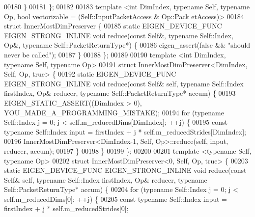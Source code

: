 \begin{DoxyCode}
00180   \}
00181 \};
00182 
00183 \textcolor{keyword}{template} <\textcolor{keywordtype}{int} DimIndex, \textcolor{keyword}{typename} Self, \textcolor{keyword}{typename} Op, \textcolor{keywordtype}{bool} vectorizable = (Self::InputPacketAccess & Op::Pack
      etAccess)>
00184 \textcolor{keyword}{struct }InnerMostDimPreserver \{
00185   \textcolor{keyword}{static} EIGEN\_DEVICE\_FUNC EIGEN\_STRONG\_INLINE \textcolor{keywordtype}{void} reduce(\textcolor{keyword}{const} Self&, \textcolor{keyword}{typename} Self::Index, Op&, \textcolor{keyword}{typename}
       Self::PacketReturnType*) \{
00186     eigen\_assert(\textcolor{keyword}{false} && \textcolor{stringliteral}{"should never be called"});
00187   \}
00188 \};
00189 
00190 \textcolor{keyword}{template} <\textcolor{keywordtype}{int} DimIndex, \textcolor{keyword}{typename} Self, \textcolor{keyword}{typename} Op>
00191 \textcolor{keyword}{struct }InnerMostDimPreserver<DimIndex, Self, Op, true> \{
00192   \textcolor{keyword}{static} EIGEN\_DEVICE\_FUNC EIGEN\_STRONG\_INLINE \textcolor{keywordtype}{void} reduce(\textcolor{keyword}{const} Self& \textcolor{keyword}{self}, \textcolor{keyword}{typename} Self::Index 
      firstIndex, Op& reducer, \textcolor{keyword}{typename} Self::PacketReturnType* accum) \{
00193     EIGEN\_STATIC\_ASSERT((DimIndex > 0), YOU\_MADE\_A\_PROGRAMMING\_MISTAKE);
00194     \textcolor{keywordflow}{for} (\textcolor{keyword}{typename} Self::Index j = 0; j < \textcolor{keyword}{self}.m\_reducedDims[DimIndex]; ++j) \{
00195       \textcolor{keyword}{const} \textcolor{keyword}{typename} Self::Index input = firstIndex + j * \textcolor{keyword}{self}.m\_reducedStrides[DimIndex];
00196       InnerMostDimPreserver<DimIndex-1, Self, Op>::reduce(\textcolor{keyword}{self}, input, reducer, accum);
00197     \}
00198   \}
00199 \};
00200 
00201 \textcolor{keyword}{template} <\textcolor{keyword}{typename} Self, \textcolor{keyword}{typename} Op>
00202 \textcolor{keyword}{struct }InnerMostDimPreserver<0, Self, Op, true> \{
00203   \textcolor{keyword}{static} EIGEN\_DEVICE\_FUNC EIGEN\_STRONG\_INLINE \textcolor{keywordtype}{void} reduce(\textcolor{keyword}{const} Self& \textcolor{keyword}{self}, \textcolor{keyword}{typename} Self::Index 
      firstIndex, Op& reducer, \textcolor{keyword}{typename} Self::PacketReturnType* accum) \{
00204     \textcolor{keywordflow}{for} (\textcolor{keyword}{typename} Self::Index j = 0; j < \textcolor{keyword}{self}.m\_reducedDims[0]; ++j) \{
00205       \textcolor{keyword}{const} \textcolor{keyword}{typename} Self::Index input = firstIndex + j * \textcolor{keyword}{self}.m\_reducedStrides[0];

\end{DoxyCode}

